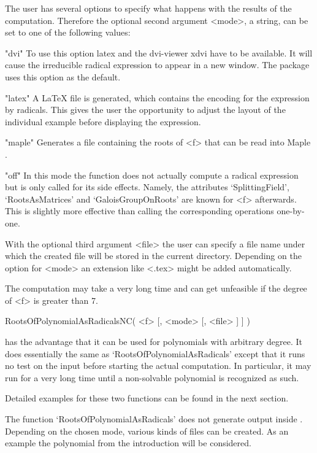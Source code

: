 The user has several options to specify what happens with the results
of the computation. Therefore the optional second argument <mode>, a
string, can be set to one of the following values:

\beginexample
"dvi"
\endexample
To use this option latex and the dvi-viewer xdvi have to be
available. It will cause the irreducible radical expression to appear in a new
window. The package uses this option as the default.

\beginexample
"latex"
\endexample
A LaTeX file is generated, which contains the encoding for the
expression by radicals. This gives the user the opportunity to adjust
the layout of the individual example before displaying the expression.

\beginexample
"maple"
\endexample
Generates a file containing the roots of <f> that can be read into
Maple \cite{Maple10}.

\beginexample
"off"
\endexample
In this mode the function does not actually compute a radical
expression but is only called for its side effects. Namely, the
attributes `SplittingField', `RootsAsMatrices' and
`GaloisGroupOnRoots' are known for <f> afterwards. This is slightly
more effective than calling the corresponding operations one-by-one.

With the optional third argument <file> the user can specify a
file name under which the created file will be stored in the current
directory. Depending on the option for <mode> an extension like <.tex>
might be added automatically.


The computation may take a very long time and can get unfeasible if the
degree of <f> is greater than 7.
\beginexample
\endexample

\> RootsOfPolynomialAsRadicalsNC( <f> [, <mode> [, <file> ] ] )

has the advantage that it can be used for polynomials with arbitrary
degree. It does essentially the same as `RootsOfPolynomialAsRadicals' except
that it runs no test on the input before starting the actual
computation. In particular, it may run for a very long time until a
non-solvable polynomial is recognized as such.

Detailed examples for these two functions can be found in the next section.


The function `RootsOfPolynomialAsRadicals' does not generate output
inside \GAP. Depending on the chosen mode, various kinds
of files can be created. As an example the polynomial from the
introduction will be considered.

